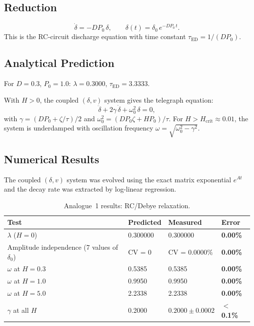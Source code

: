 \documentclass[11pt]{article}
\begin{document}
\subsection{Reduction}

\begin{equation}\label{eq:rc}
  \dot{\delta} = -D P_0\,\delta, \qquad \delta(t) = \delta_0\,e^{-D P_0\,t}.
\end{equation}
This is the RC-circuit discharge equation with time constant \(\tau_{\mathrm{ED}} = 1/(DP_0)\).

\subsection{Analytical Prediction}

For \(D = 0.3\), \(P_0 = 1.0\): \(\lambda = 0.3000\), \(\tau_{\mathrm{ED}} = 3.3333\).

With \(H > 0\), the coupled \((\delta, v)\) system gives the telegraph equation:
\begin{equation}\label{eq:telegraph}
  \ddot{\delta} + 2\gamma\,\dot{\delta} + \omega_0^2\,\delta = 0,
\end{equation}
with \(\gamma = (DP_0 + \zeta/\tau)/2\) and \(\omega_0^2 = (DP_0\zeta + HP_0)/\tau\). For \(H > H_{\mathrm{crit}} \approx 0.01\), the system is underdamped with oscillation frequency \(\omega = \sqrt{\omega_0^2 - \gamma^2}\).

\subsection{Numerical Results}

The coupled \((\delta, v)\) system was evolved using the exact matrix exponential \(e^{At}\) and the decay rate was extracted by log-linear regression.

\begin{table}[h]
\centering
\begin{tabular}{@{}llll@{}}
\toprule
Test & Predicted & Measured & Error \\
\midrule
\(\lambda\) (\(H=0\)) & 0.300000 & 0.300000 & \textbf{0.00\%} \\
Amplitude independence (7 values of \(\delta_0\)) & CV = 0 & CV = 0.0000\% & \textbf{0.00\%} \\
\(\omega\) at \(H=0.3\) & 0.5385 & 0.5385 & \textbf{0.00\%} \\
\(\omega\) at \(H=1.0\) & 0.9950 & 0.9950 & \textbf{0.00\%} \\
\(\omega\) at \(H=5.0\) & 2.2338 & 2.2338 & \textbf{0.00\%} \\
\(\gamma\) at all \(H\) & 0.2000 & \(0.2000\pm0.0002\) & \textbf{\(<\)0.1\%} \\
\bottomrule
\end{tabular}
\caption{Analogue~1 results: RC/Debye relaxation.}
\label{tab:rc-results}
\end{table}
\end{document}
